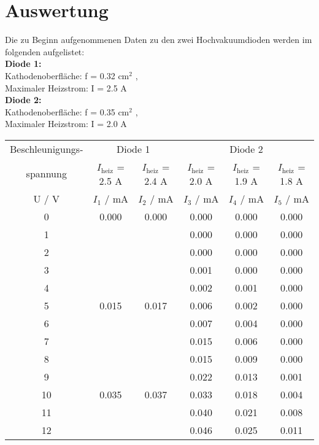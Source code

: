\section{Auswertung}
\label{sec:Auswertung}
Die zu Beginn aufgenommenen Daten zu den zwei Hochvakuumdioden werden im folgenden aufgelistet:\\
\textbf{Diode 1:} \\
  Kathodenoberfläche: f = 0.32 cm$^{2}$ , \\
  Maximaler Heizstrom: I = 2.5 A \\
\textbf{Diode 2:} \\
  Kathodenoberfläche: f = 0.35 cm$^{2}$ , \\
  Maximaler Heizstrom: I = 2.0 A \\

  \begin{table}[H] %
    \small
    \centering
    \begin{tabular}{c||c|c|c|c|c}
      \toprule
      Beschleunigungs- & \multicolumn{2}{c|}{Diode 1} & \multicolumn{3}{c}{Diode 2} \\
      spannung & $I_\text{heiz}$ = 2.5 A & $I_\text{heiz}$ = 2.4 A & $I_\text{heiz}$ = 2.0 A & $I_\text{heiz}$ = 1.9 A & $I_\text{heiz}$ = 1.8 A \\
      \midrule
      U / V & $I_1$ / mA & $I_2$ / mA & $I_3$ / mA & $I_4$ / mA & $I_5$ / mA \\
      \midrule
      0	  & 0.000 & 0.000 & 0.000	& 0.000	& 0.000 \\
      1	  &       &       & 0.000	& 0.000	& 0.000 \\
      2	  &       &       & 0.000	& 0.000	& 0.000 \\
      3	  &       &       & 0.001	& 0.000	& 0.000 \\
      4	  &       &       & 0.002	& 0.001	& 0.000 \\
      5	  & 0.015 & 0.017 & 0.006	& 0.002	& 0.000 \\
      6	  &       &       & 0.007	& 0.004	& 0.000 \\
      7	  &       &       & 0.015	& 0.006	& 0.000 \\
      8	  &       &       & 0.015	& 0.009	& 0.000 \\
      9	  &       &       & 0.022	& 0.013	& 0.001 \\
      10	& 0.035 & 0.037 & 0.033	& 0.018	& 0.004 \\
      11	&       &       & 0.040	& 0.021	& 0.008 \\
      12	&       &       & 0.046	& 0.025	& 0.011 \\

\end{tabular}
\end{table}
